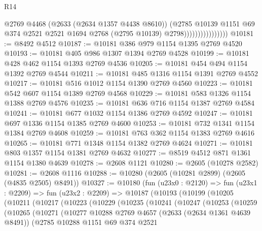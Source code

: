 \begin{lexlean}{R14}
\begin{coremodule}
                                  @2769
                                  @4468
                                  (@2633 (@2634 @1357 @4438 @8610))
                                  (@2785
                                    @10139
                                    @1151
                                    @69
                                    @374
                                    @2521
                                    @2521
                                    @1694
                                    @2768
                                    (@2795 @10139)
                                    @2798))))))))))))))))
@10181 := @8492 @4512
@10187 := @10181 @386 @979 @1154 @1395 @2769 @4520
@10193 := @10181 @405 @986 @1307 @1394 @2769 @4528
@10199 := @10181 @428 @462 @1154 @1393 @2769 @4536
@10205 := @10181 @454 @494 @1154 @1392 @2769 @4544
@10211 := @10181 @485 @1316 @1154 @1391 @2769 @4552
@10217 := @10181 @516 @1012 @1154 @1390 @2769 @4560
@10223 := @10181 @542 @607 @1154 @1389 @2769 @4568
@10229 := @10181 @583 @1326 @1154 @1388 @2769 @4576
@10235 := @10181 @636 @716 @1154 @1387 @2769 @4584
@10241 := @10181 @677 @1032 @1154 @1386 @2769 @4592
@10247 := @10181 @697 @1336 @1154 @1385 @2769 @4600
@10253 := @10181 @732 @1341 @1154 @1384 @2769 @4608
@10259 := @10181 @763 @362 @1154 @1383 @2769 @4616
@10265 := @10181 @771 @1348 @1154 @1382 @2769 @4624
@10271 := @10181 @803 @1357 @1154 @1381 @2769 @4632
@10277 := @8519 @4512 @871 @1361 @1154 @1380 @4639
@10278 := @2608 @1121
@10280 := @2605 (@10278 @2582)
@10281 := @2608 @1116
@10288 := @10280 (@2605 (@10281 @2899) (@2605 (@4835 @2505) @8491))
@10327 := @10180
    (fun (u23x0 : @2120) =>
    fun (u23x1 : @2209) =>
    fun (u23x2 : @2209) =>
    @10187
      (@10193
        (@10199
          (@10205
            (@10211
              (@10217
                (@10223
                  (@10229
                    (@10235
                      (@10241
                        (@10247
                          (@10253
                            (@10259
                              (@10265
                                (@10271
                                  (@10277
                                    @10288
                                    @2769
                                    @4657
                                    (@2633 (@2634 @1361 @4639 @8491))
                                    (@2785
                                      @10288
                                      @1151
                                      @69
                                      @374
                                      @2521

\end{coremodule}
\end{lexlean}
